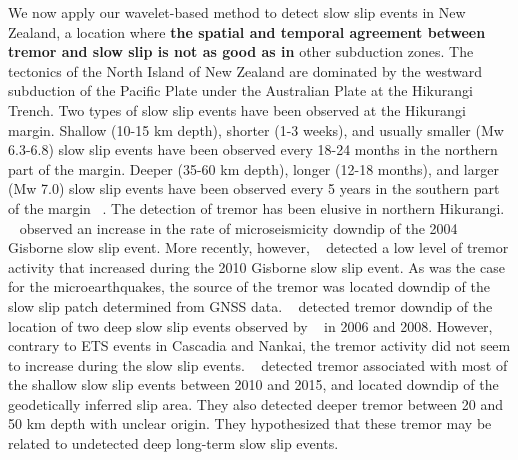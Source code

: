 \documentclass{article}
\begin{document}
We now apply our wavelet-based method to detect slow slip events in New Zealand, a location where \textbf{the spatial and temporal agreement between tremor and slow slip is not as good as in} other subduction zones. The tectonics of the North Island of New Zealand are dominated by the westward subduction of the Pacific Plate under the Australian Plate at the Hikurangi Trench. Two types of slow slip events have been observed at the Hikurangi margin. Shallow (10-15 km depth), shorter (1-3 weeks), and usually smaller (Mw 6.3-6.8) slow slip events have been observed every 18-24 months in the northern part of the margin. Deeper (35-60 km depth), longer (12-18 months), and larger (Mw 7.0) slow slip events have been observed every 5 years in the southern part of the margin ~\citep{WAL_2010,TOD_2016}. The detection of tremor has been elusive in northern Hikurangi. ~\citet{DEL_2009} observed an increase in the rate of microseismicity downdip of the 2004 Gisborne slow slip event. More recently, however, ~\citep{KIM_2011} detected a low level of tremor activity that increased during the 2010 Gisborne slow slip event. As was the case for the microearthquakes, the source of the tremor was located downdip of the slow slip patch determined from GNSS data. ~\citep{IDE_2012} detected tremor downdip of the location of two deep slow slip events observed by ~\citet{WAL_2013} in 2006 and 2008. However, contrary to ETS events in Cascadia and Nankai, the tremor activity did not seem to increase during the slow slip events. ~\citet{TOD_2016}  detected tremor associated with most of the shallow slow slip events between 2010 and 2015, and located downdip of the geodetically inferred slip area. They also detected deeper tremor between 20 and 50 km depth with unclear origin. They hypothesized that these tremor may be related to undetected deep long-term slow slip events. \\
\end{document}

